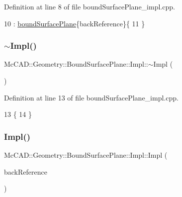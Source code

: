 Definition at line 8 of file bound\+Surface\+Plane\+\_\+impl.\+cpp.


\begin{DoxyCode}
10     : \hyperlink{classMcCAD_1_1Geometry_1_1BoundSurfacePlane_1_1Impl_a272076fe54fdd949acb310eece31f498}{boundSurfacePlane}\{backReference\}\{
11 \}
\end{DoxyCode}
\mbox{\label{classMcCAD_1_1Geometry_1_1BoundSurfacePlane_1_1Impl_a4e0bf051ebb29c0beabcb090d7e76a57}} 
\subsubsection{\texorpdfstring{$\sim$\+Impl()}{~Impl()}\hspace{0.1cm}{\footnotesize\ttfamily [1/2]}}
{\footnotesize\ttfamily Mc\+C\+A\+D\+::\+Geometry\+::\+Bound\+Surface\+Plane\+::\+Impl\+::$\sim$\+Impl (\begin{DoxyParamCaption}{ }\end{DoxyParamCaption})}



Definition at line 13 of file bound\+Surface\+Plane\+\_\+impl.\+cpp.


\begin{DoxyCode}
13                                          \{
14 \}
\end{DoxyCode}
\mbox{\label{classMcCAD_1_1Geometry_1_1BoundSurfacePlane_1_1Impl_a0ee45438392854a18ea011b5f324962f}} 
\subsubsection{\texorpdfstring{Impl()}{Impl()}\hspace{0.1cm}{\footnotesize\ttfamily [2/2]}}
{\footnotesize\ttfamily Mc\+C\+A\+D\+::\+Geometry\+::\+Bound\+Surface\+Plane\+::\+Impl\+::\+Impl (\begin{DoxyParamCaption}\item[{\hyperlink{classMcCAD_1_1Geometry_1_1BoundSurfacePlane}{Bound\+Surface\+Plane} $\ast$}]{back\+Reference }\end{DoxyParamCaption})}

